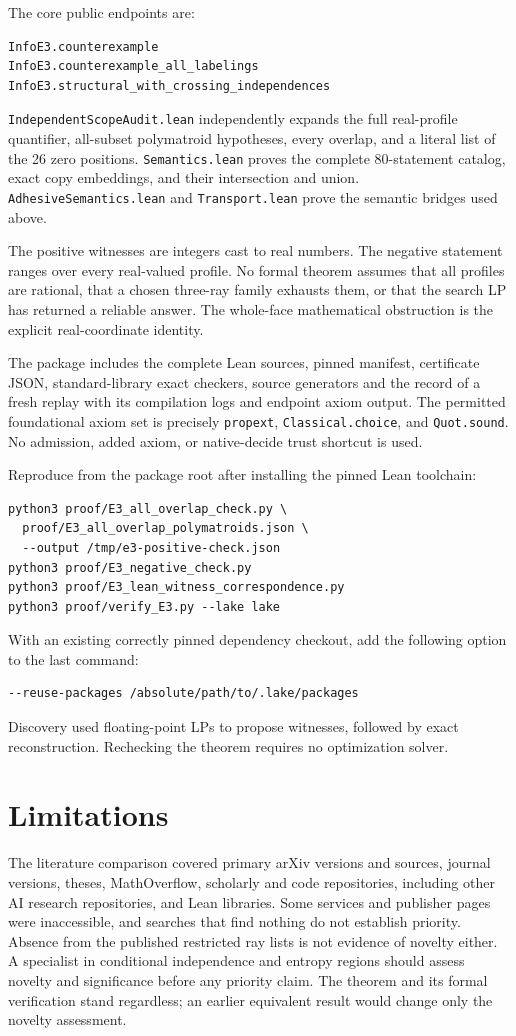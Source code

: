 \documentclass[11pt]{article}
\begin{document}
The core public endpoints are:
\begin{Verbatim}[fontsize=\small]
InfoE3.counterexample
InfoE3.counterexample_all_labelings
InfoE3.structural_with_crossing_independences
\end{Verbatim}
\texttt{IndependentScopeAudit.lean} independently expands the full real-profile
quantifier, all-subset polymatroid hypotheses, every overlap, and a literal
list of the 26 zero positions. \texttt{Semantics.lean} proves the complete
80-statement catalog, exact copy embeddings, and their intersection and union.
\texttt{AdhesiveSemantics.lean} and \texttt{Transport.lean} prove the semantic
bridges used above.

The positive witnesses are integers cast to real numbers. The negative
statement ranges over every real-valued profile. No formal theorem assumes
that all profiles are rational, that a chosen three-ray family exhausts them,
or that the search LP has returned a reliable answer. The whole-face
mathematical obstruction is the explicit real-coordinate identity.

The package includes the complete Lean sources, pinned manifest,
certificate JSON, standard-library exact checkers, source generators and the
record of a fresh replay with its compilation logs and endpoint axiom output. The permitted
foundational axiom set is precisely \texttt{propext},
\texttt{Classical.choice}, and \texttt{Quot.sound}. No admission, added axiom,
or native-decide trust shortcut is used.

Reproduce from the package root after installing the pinned Lean toolchain:
\begin{Verbatim}[fontsize=\small]
python3 proof/E3_all_overlap_check.py \
  proof/E3_all_overlap_polymatroids.json \
  --output /tmp/e3-positive-check.json
python3 proof/E3_negative_check.py
python3 proof/E3_lean_witness_correspondence.py
python3 proof/verify_E3.py --lake lake
\end{Verbatim}
With an existing correctly pinned dependency checkout, add the following
option to the last command:
\begin{Verbatim}[fontsize=\small]
--reuse-packages /absolute/path/to/.lake/packages
\end{Verbatim}
Discovery used floating-point LPs to propose witnesses, followed by exact
reconstruction. Rechecking the theorem requires no optimization solver.

\section{Limitations}\label{sec:limits}
The literature comparison covered primary arXiv versions and sources, journal
versions, theses, MathOverflow, scholarly and code repositories, including
other AI research repositories, and Lean libraries. Some services and
publisher pages were inaccessible, and searches that find nothing do not
establish priority. Absence from the published restricted ray lists is not
evidence of novelty either. A specialist in conditional independence and
entropy regions should assess novelty and significance before any priority
claim. The theorem and its formal verification stand regardless; an earlier
equivalent result would change only the novelty assessment.
\end{document}
